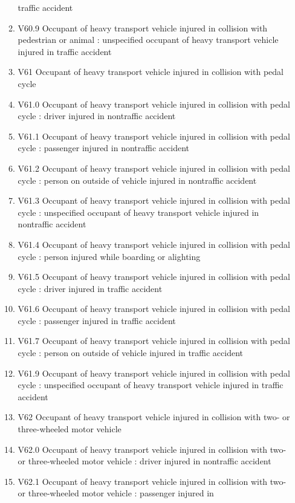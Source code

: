 \documentclass[
]{scrartcl}
\begin{document}
\begin{itemize}
\begin{enumerate}
    traffic accident
  \item
    V60.9 Occupant of heavy transport vehicle injured in collision with
    pedestrian or animal : unspecified occupant of heavy transport
    vehicle injured in traffic accident
  \item
    V61 Occupant of heavy transport vehicle injured in collision with
    pedal cycle
  \item
    V61.0 Occupant of heavy transport vehicle injured in collision with
    pedal cycle : driver injured in nontraffic accident
  \item
    V61.1 Occupant of heavy transport vehicle injured in collision with
    pedal cycle : passenger injured in nontraffic accident
  \item
    V61.2 Occupant of heavy transport vehicle injured in collision with
    pedal cycle : person on outside of vehicle injured in nontraffic
    accident
  \item
    V61.3 Occupant of heavy transport vehicle injured in collision with
    pedal cycle : unspecified occupant of heavy transport vehicle
    injured in nontraffic accident
  \item
    V61.4 Occupant of heavy transport vehicle injured in collision with
    pedal cycle : person injured while boarding or alighting
  \item
    V61.5 Occupant of heavy transport vehicle injured in collision with
    pedal cycle : driver injured in traffic accident
  \item
    V61.6 Occupant of heavy transport vehicle injured in collision with
    pedal cycle : passenger injured in traffic accident
  \item
    V61.7 Occupant of heavy transport vehicle injured in collision with
    pedal cycle : person on outside of vehicle injured in traffic
    accident
  \item
    V61.9 Occupant of heavy transport vehicle injured in collision with
    pedal cycle : unspecified occupant of heavy transport vehicle
    injured in traffic accident
  \item
    V62 Occupant of heavy transport vehicle injured in collision with
    two- or three-wheeled motor vehicle
  \item
    V62.0 Occupant of heavy transport vehicle injured in collision with
    two- or three-wheeled motor vehicle : driver injured in nontraffic
    accident
  \item
    V62.1 Occupant of heavy transport vehicle injured in collision with
    two- or three-wheeled motor vehicle : passenger injured in

\end{enumerate}
\end{itemize}
\end{document}
